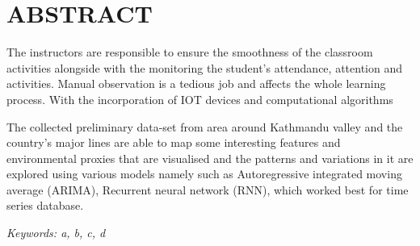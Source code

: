 \newpage
\section*{ABSTRACT}
The instructors are responsible to ensure the smoothness of the classroom activities alongside with the monitoring the student's attendance, attention and activities. Manual observation is a tedious job and affects the whole learning process. With the incorporation of IOT devices and computational algorithms 

The collected preliminary data-set from area around Kathmandu valley and the country's major lines are able to map some interesting features and environmental proxies that are visualised and the patterns and variations in it are explored using various models namely such as Autoregressive integrated moving average (ARIMA), Recurrent neural network (RNN), which worked best for time series database. 



\textit {Keywords:  a, b, c, d }